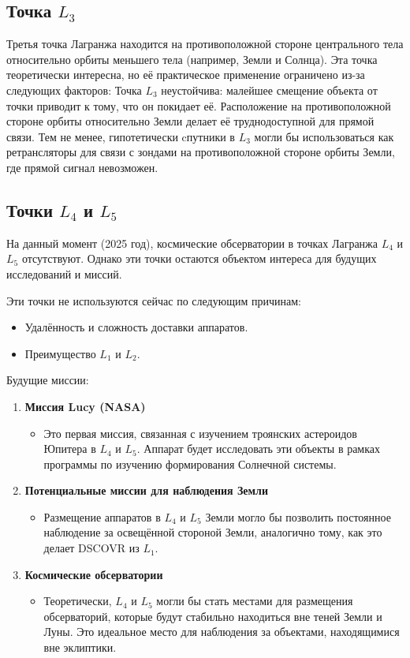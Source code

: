 \documentclass[a4paper,12pt]{article}
\begin{document}
\subsection{Точка $L_3$}

Третья точка Лагранжа находится на противоположной стороне центрального тела относительно орбиты меньшего тела (например, Земли и Солнца).
Эта точка теоретически интересна, но её практическое применение ограничено из-за следующих факторов:
Точка $L_3$ неустойчива: малейшее смещение объекта от точки приводит к тому, что он покидает её.
Расположение на противоположной стороне орбиты относительно Земли делает её труднодоступной для прямой связи.
Тем не менее, гипотетически cпутники в $L_3$ могли бы использоваться как ретрансляторы для связи с зондами на противоположной стороне орбиты Земли, 
где прямой сигнал невозможен.

\subsection{Точки $L_4$ и $L_5$}

На данный момент (2025 год), космические обсерватории в точках Лагранжа $L_4$ и $L_5$ отсутствуют.
Однако эти точки остаются объектом интереса для будущих исследований и миссий.

Эти точки не используются сейчас по следующим причинам: 
\begin{itemize}
\item Удалённость и сложность доставки аппаратов.
\item Преимущество $L_1$ и $L_2$.
\end{itemize}

Будущие миссии:

\begin{enumerate}

\item{\textbf{Миссия Lucy (NASA)}}
\begin{itemize} 
\item Это первая миссия, связанная с изучением троянских астероидов Юпитера в $L_4$ и $L_5$.
Аппарат будет исследовать эти объекты в рамках программы по изучению формирования Солнечной системы.
\end{itemize}

\item{\textbf{Потенциальные миссии для наблюдения Земли}}
\begin{itemize} 
\item Размещение аппаратов в $L_4$ и $L_5$ Земли могло бы позволить постоянное наблюдение за освещённой стороной Земли, аналогично тому, как это делает DSCOVR из $L_1$.
\end{itemize}

\item{\textbf{Космические обсерватории}}
\begin{itemize} 
\item Теоретически, $L_4$ и $L_5$ могли бы стать местами для размещения обсерваторий, которые будут стабильно находиться вне теней Земли и Луны.
Это идеальное место для наблюдения за объектами, находящимися вне эклиптики.
\end{itemize}

\end{enumerate}
\end{document}
